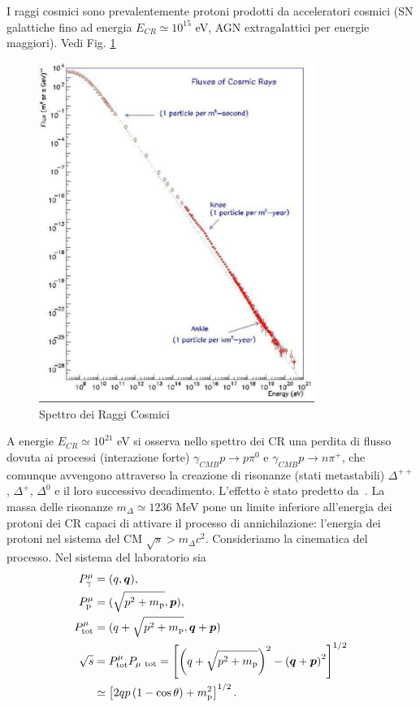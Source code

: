 I raggi cosmici sono prevalentemente protoni prodotti da acceleratori cosmici
(SN galattiche fino ad energia $E_{CR} \simeq 10^{15}$ eV, AGN extragalattici
per energie maggiori). Vedi Fig. \ref{fig:CR1}
 \begin{figure}
   \centering{}
   \includegraphics[width=0.8\textwidth]{figure/CR_spectrum_1.pdf}
  \caption{Spettro dei Raggi Cosmici}
  \label{fig:CR1}
\end{figure}
A energie $E_{CR} \simeq 10^{21}$ eV si osserva nello spettro dei CR una perdita
di flusso dovuta ai processi (interazione forte) $\gamma_{CMB} p \to p \pi^0$ e
$\gamma_{CMB} p \to n \pi^+$, che comunque avvengono attraverso la creazione di
risonanze (stati metastabili) $\Delta^{++}$, $\Delta^{+}$, $\Delta^{0}$ e il
loro successivo decadimento.  L'effetto è stato predetto
da~\textcites{1966PhRvL..16..748G}{1966JETPL...4...78Z}.  La massa delle
risonanze $m_{\Delta} \simeq 1236$ MeV pone un limite inferiore all'energia dei
protoni dei CR capaci di attivare il processo di annichilazione: l'energia dei
protoni nel sistema del CM $\sqrt{s} > m_{\Delta} c^2$.  Consideriamo la
cinematica del processo.  Nel sistema del laboratorio sia
\begin{subequations}
  \begin{align}
    P^{\mu}_{\gamma}      &= (q, \bm{q}), \\
    P^{\mu}_{\textup{p}}   &= (\sqrt{p^2+m_\textup{p}}, \bm{p}), \\
    P^{\mu}_{\textup{tot}} &= ( q+\sqrt{p^2+m_\textup{p}}  ,  \bm{q} + \bm{p}) \\
    \sqrt{s}          &= P^{\mu}_{\textup{tot}} P_{\mu~\textup{tot}} =
                        \left[ \left( q+\sqrt{p^2+m_\textup{p}} \right)^2 -
                        \left(\bm{q}+ \bm{p} \right)^2 \right]^{1/2} \\
                      & \simeq \left[ 2qp \left(1-\cos \theta \right) +
                        m_\textup{p}^2 \right]^{1/2}.
  \end{align}
\end{subequations}
